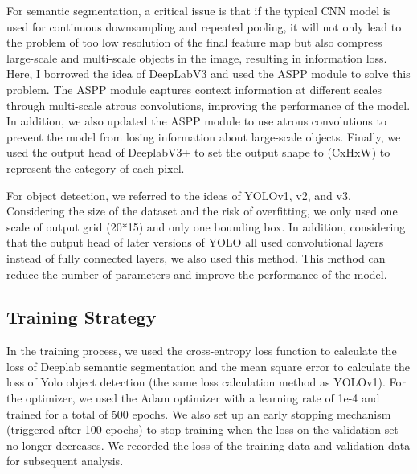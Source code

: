 \documentclass[conference]{IEEEtran}
\begin{document}
For semantic segmentation, a critical issue is that if the typical CNN model is used for continuous downsampling and repeated pooling, it will not only lead to the problem of too low resolution of the final feature map but also compress large-scale and multi-scale objects in the image, resulting in information loss. Here, I borrowed the idea of DeepLabV3 and used the ASPP module to solve this problem. The ASPP module captures context information at different scales through multi-scale atrous convolutions, improving the performance of the model. In addition, we also updated the ASPP module to use atrous convolutions to prevent the model from losing information about large-scale objects. Finally, we used the output head of DeeplabV3+ to set the output shape to (CxHxW) to represent the category of each pixel.


For object detection, we referred to the ideas of YOLOv1, v2, and v3. Considering the size of the dataset and the risk of overfitting, we only used one scale of output grid (20*15) and only one bounding box. In addition, considering that the output head of later versions of YOLO all used convolutional layers instead of fully connected layers, we also used this method. This method can reduce the number of parameters and improve the performance of the model.

\subsection{Training Strategy}



In the training process, we used the cross-entropy loss function to calculate the loss of Deeplab semantic segmentation and the mean square error to calculate the loss of Yolo object detection (the same loss calculation method as YOLOv1). For the optimizer, we used the Adam optimizer with a learning rate of 1e-4 and trained for a total of 500 epochs. We also set up an early stopping mechanism (triggered after 100 epochs) to stop training when the loss on the validation set no longer decreases. We recorded the loss of the training data and validation data for subsequent analysis.
\end{document}
